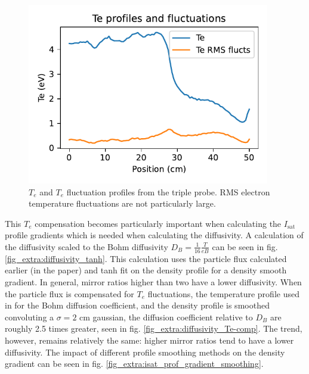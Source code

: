 \begin{figure}
    \centering
    \includegraphics[width=300pt]{figures/extra/Te_prof_flucts.pdf}
    \caption[Triple probe $T_e$ and $T_e$ fluctuation profiles]{$T_e$ and $T_e$ fluctuation profiles from the triple probe. RMS electron temperature fluctuations are not particularly large.}
    \label{fig_extra:Te_prof_flucts}
\end{figure}

This $T_e$ compensation becomes particularly important when calculating the $I_\text{sat}$ profile gradients which is needed when calculating the diffusivity. A calculation of the diffusivity scaled to the Bohm diffusivity $D_B = \frac{1}{16} \frac{T}{eB}$ can be seen in fig. \ref{fig_extra:diffusivity_tanh}. This calculation uses the particle flux calculated earlier (in the paper) and tanh fit on the density profile for a density smooth gradient. In general, mirror ratios higher than two have a lower diffusivity. When the particle flux is compensated for $T_e$ fluctuations, the temperature profile used in for the Bohm diffusion coefficient, and the density profile is smoothed convoluting a $\sigma=2$ cm gaussian, the diffusion coefficient relative to $D_B$ are roughly 2.5 times greater, seen in fig. \ref{fig_extra:diffusivity_Te-comp}. The trend, however, remains relatively the same: higher mirror ratios tend to have a lower diffusivity. The impact of different profile smoothing methods on the density gradient can be seen in fig. \ref{fig_extra:isat_prof_gradient_smoothing}.

